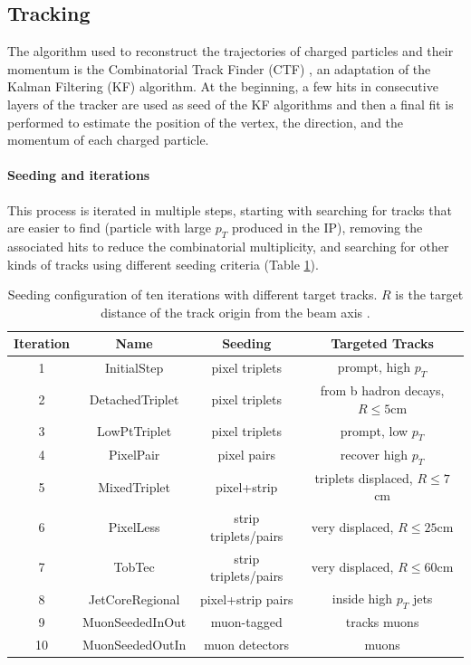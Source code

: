 \subsection{Tracking}\label{sec:tracking}
The algorithm used to reconstruct the trajectories of charged particles and their momentum is the Combinatorial Track Finder (CTF) \cite{Chatrchyan2014DescriptionTracker}, an adaptation of the Kalman Filtering (KF) \cite{Fruhwirth1987ApplicationFitting} algorithm.
At the beginning, a few hits in consecutive layers of the tracker are used as seed of the KF algorithms and then a final fit is performed to estimate the position of the vertex, the direction, and the momentum of each charged particle.\\

\paragraph*{Seeding and iterations}
This process is iterated in multiple steps, starting with searching for tracks that are easier to find (\eg particle with large $p_T$ produced in the IP), removing the associated hits to reduce the combinatorial multiplicity, and searching for other kinds of tracks using different seeding criteria (Table \ref{tab:track_seeding}).

\begin{table}[h!]
    \centering
    \begin{tabular}{|c|c|c|c|}
    \hline
    Iteration&Name&Seeding&Targeted Tracks\\
    \hline
    1& InitialStep&pixel triplets&prompt, high $p_T$\\
    2& DetachedTriplet&pixel triplets&from b hadron decays, $R\leq 5$cm\\
    3& LowPtTriplet&pixel triplets&prompt, low $p_T$\\
    4& PixelPair&pixel pairs&recover high $p_T$\\
    5& MixedTriplet&pixel+strip&triplets displaced, $R\leq 7$cm\\
    6& PixelLess&strip triplets/pairs&very displaced, $R\leq 25$cm\\
    7& TobTec&strip triplets/pairs&very displaced, $R\leq 60$cm\\
    8& JetCoreRegional&pixel+strip pairs&inside high $p_T$ jets\\
    9& MuonSeededInOut&muon-tagged&tracks muons\\
    10& MuonSeededOutIn&muon detectors&muons \\
    \hline
    \end{tabular}
    \caption{Seeding configuration of ten iterations with different target tracks. $R$ is the target distance of the track origin from the beam axis \cite{Sirunyan2017Particle-flowDetector}. }
    \label{tab:track_seeding}
\end{table}

